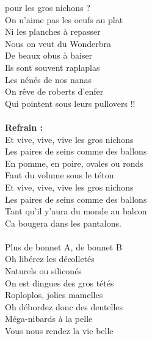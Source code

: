 
 pour les gros nichons ?
\\On n'aime pas les oeufs au plat
\\Ni les planches à repasser
\\Nous on veut du Wonderbra
\\De beaux obus à baiser
\\Ils sont souvent raplaplas
\\Les nénés de nos nanas
\\On rêve de roberts d'enfer
\\Qui pointent sous leurs pullovers !!
\\\\\textbf{Refrain :}
\\Et vive, vive, vive les gros nichons
\\Les paires de seins comme des ballons
\\En pomme, en poire, ovales ou ronds
\\Faut du volume sous le téton
\\Et vive, vive, vive les gros nichons
\\Les paires de seins comme des ballons
\\Tant qu'il y'aura du monde au balcon
\\Ca bougera dans les pantalons.
\\\\Plus de bonnet A, de bonnet B
\\Oh libérez les décolletés
\\Naturels ou siliconés
\\On est dingues des gros tétés
\\Roploplos, jolies mamelles
\\Oh débordez donc des dentelles
\\Méga-nibards à la pelle
\\Vous nous rendez la vie belle

\breakpage